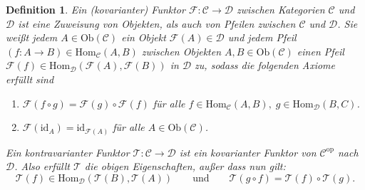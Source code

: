 \documentclass[a4paper, 11pt]{scrartcl}
\newcommand{\Hom}{\text{Hom}}
\newcommand{\id}{\text{id}}
\newcommand{\Ob}{\text{Ob}}
\theoremstyle{basicstyle}
\newtheorem{definition}{Definition}[section]
\begin{document}
    \begin{definition}
        Ein \emph{(kovarianter) Funktor} \(\mathcal{F}: \mathcal{C} \to \mathcal{D}\) zwischen Kategorien \(\mathcal{C}\) und \(\mathcal{D}\) ist eine Zuweisung von Objekten, als auch von Pfeilen zwischen \(\mathcal{C}\) und \(\mathcal{D}\).
        Sie weißt jedem \(A \in \Ob(\mathcal{C})\) ein Objekt \(\mathcal{F}(A) \in \mathcal{D}\) und jedem Pfeil \((f: A \to B) \in \Hom_\mathcal{C}(A, B)\) zwischen Objekten \(A, B \in \Ob(\mathcal{C})\) einen Pfeil \(\mathcal{F}(f) \in \Hom_{\mathcal{D}}(\mathcal{F}(A), \mathcal{F}(B))\) in \(\mathcal{D}\) zu, sodass die folgenden Axiome erfüllt sind
        \begin{enumerate}
            \item \(\mathcal{F}(f \circ g) = \mathcal{F}(g) \circ \mathcal{F}(f)\) für alle \(f \in \Hom_{\mathcal{C}}(A, B), \; g \in \Hom_{\mathcal{D}}(B, C)\).
            \item \(\mathcal{F}(\id_A) = \id_{\mathcal{F}(A)}\) für alle \(A \in \Ob(\mathcal{C})\).
        \end{enumerate}
        Ein \emph{kontravarianter Funktor} \(\mathcal{T}: \mathcal{C} \to \mathcal{D}\) ist ein kovarianter Funktor von \(\mathcal{C}^{\text{op}}\) nach \(\mathcal{D}\).
        Also erfüllt \(\mathcal{T}\) die obigen Eigenschaften, außer dass nun gilt:
        \[\mathcal{T}(f) \in \Hom_{\mathcal{D}}(\mathcal{T}(B), \mathcal{T}(A)) \qquad\text{und}\qquad \mathcal{T}(g \circ f) = \mathcal{T}(f) \circ \mathcal{T}(g).\]
    \end{definition}
\end{document}
